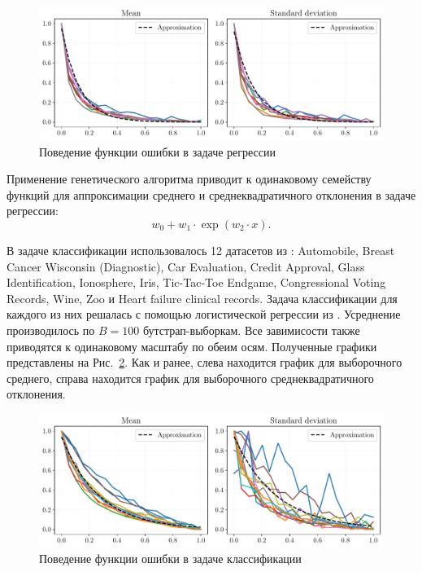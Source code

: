 \begin{figure}[h!]
    \centering
    \includegraphics[width=\textwidth]{figures/datasets_regression.pdf}
    \caption{Поведение функции ошибки в задаче регрессии}
    \label{datasets_regression}
\end{figure}

Применение генетического алгоритма приводит к одинаковому семейству функций для аппроксимации среднего и среднеквадратичного отклонения в задаче регрессии:
\[ w_0 + w_1 \cdot \exp(w_2 \cdot x). \]

В задаче классификации использовалось 12 датасетов из \citep{UCI}: Automobile, Breast Cancer Wisconsin (Diagnostic), Car Evaluation, Credit Approval, Glass Identification, Ionosphere, Iris, Tic-Tac-Toe Endgame, Congressional Voting Records, Wine, Zoo и Heart failure clinical records. Задача классификации для каждого из них решалась с помощью логистической регрессии из \citep{scikit-learn}. Усреднение производилось по $B = 100$ бутстрап-выборкам. Все завимисости также приводятся к одинаковому масштабу по обеим осям. Полученные графики представлены на Рис.~\ref{datasets_classification}. Как и ранее, слева находится график для выборочного среднего, справа находится график для выборочного среднеквадратичного отклонения.

\begin{figure}[h!]
    \centering
    \includegraphics[width=\textwidth]{figures/datasets_classification.pdf}
    \caption{Поведение функции ошибки в задаче классификации}
    \label{datasets_classification}
\end{figure}

